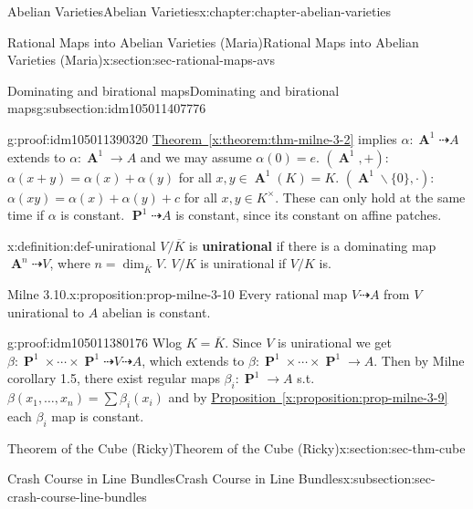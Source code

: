 \documentclass[oneside,10pt,]{book}
\newcommand{\terminology}[1]{\textbf{#1}}
\numberwithin{equation}{section}
\DeclareMathOperator{\aff}{\mathbf{A}}
\DeclareMathOperator{\PP}{\mathbf{P}}
\begin{document}
\begin{chapterptx}{Abelian Varieties}{}{Abelian Varieties}{}{}{x:chapter:chapter-abelian-varieties}
\begin{sectionptx}{Rational Maps into Abelian Varieties (Maria)}{}{Rational Maps into Abelian Varieties (Maria)}{}{}{x:section:sec-rational-maps-avs}
\begin{subsectionptx}{Dominating and birational maps}{}{Dominating and birational maps}{}{}{g:subsection:idm105011407776}
\begin{proofptx}{}{g:proof:idm105011390320}
\hyperref[x:theorem:thm-milne-3-2]{Theorem~\ref{x:theorem:thm-milne-3-2}} implies \(\alpha \colon \aff^1 \dashrightarrow A\) extends to \(\alpha \colon \aff^1\to A\) and we may assume \(\alpha(0) = e\). \((\aff^1, +)\): \(\alpha(x+y) = \alpha(x) + \alpha(y)\) for all \(x,y\in \aff^1(K) = K\). \((\aff^1\smallsetminus\{0\}, \cdot)\): \(\alpha(xy) = \alpha(x) + \alpha(y) + c\) for all \(x,y\in K^\times\). These can only hold at the same time if \(\alpha\) is constant. \(\PP^1 \dashrightarrow A\) is constant, since its constant on affine patches.%
\end{proofptx}
\begin{definition}{}{x:definition:def-unirational}%
\(V/\overline K\) is \terminology{unirational} if there is a dominating map \(\aff^n \dashrightarrow V\), where \(n = \dim_{\overline K} V\). \(V/K\) is unirational if \(V/K\) is.%
\end{definition}
\begin{proposition}{Milne 3.10.}{}{x:proposition:prop-milne-3-10}%
Every rational map \(V\dashrightarrow A\) from \(V\) unirational to \(A\) abelian is constant.%
\end{proposition}
\begin{proofptx}{}{g:proof:idm105011380176}
Wlog \(K = \overline K\). Since \(V\) is unirational we get \(\beta \colon \PP^1\times\cdots\times\PP^1 \dashrightarrow V\dashrightarrow A\), which extends to \(\beta \colon \PP^1\times\cdots\times\PP^1 \to A\). Then by Milne corollary 1.5, there exist regular maps \(\beta_i \colon \PP^1 \to A\) s.t. \(\beta(x_1,\ldots, x_n) = \sum \beta_i(x_i)\) and by \hyperref[x:proposition:prop-milne-3-9]{Proposition~\ref{x:proposition:prop-milne-3-9}} each \(\beta_i\) map is constant.%
\end{proofptx}
\end{subsectionptx}
\end{sectionptx}
%
%
\typeout{************************************************}
\typeout{************************************************}
%
\begin{sectionptx}{Theorem of the Cube (Ricky)}{}{Theorem of the Cube (Ricky)}{}{}{x:section:sec-thm-cube}
%
%
\typeout{************************************************}
\typeout{************************************************}
%
\begin{subsectionptx}{Crash Course in Line Bundles}{}{Crash Course in Line Bundles}{}{}{x:subsection:sec-crash-course-line-bundles}

\end{subsectionptx}
\end{sectionptx}
\end{chapterptx}
\end{document}
